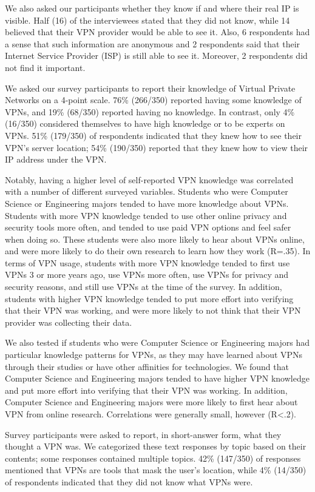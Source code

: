 We also asked our participants whether they know if and where their real IP is visible. Half (16) of the interviewees stated that they did not know, while 14 believed that their VPN provider would be able to see it. Also, 6 respondents had a sense that such information are anonymous and 2 respondents said that their Internet Service Provider (ISP) is still able to see it. Moreover, 2 respondents did not find it important.

We asked our survey participants to report their knowledge of Virtual Private Networks on a 4-point scale. 76\% (266/350) reported having some knowledge of VPNs, and 19\% (68/350) reported having no knowledge. In contrast, only 4\% (16/350) considered themselves to have high knowledge or to be experts on VPNs. 51\% (179/350) of respondents indicated that they knew how to see their VPN’s server location; 54\% (190/350) reported that they knew how to view their IP address under the VPN.

Notably, having a higher level of self-reported VPN knowledge was correlated with a number of different surveyed variables. Students who were Computer Science or Engineering majors tended to have more knowledge about VPNs. Students with more VPN knowledge tended to use other online privacy and security tools more often, and tended to use paid VPN options and feel safer when doing so. These students were also more likely to hear about VPNs online, and were more likely to do their own research to learn how they work (R=.35). In terms of VPN usage, students with more VPN knowledge tended to first use VPNs 3 or more years ago, use VPNs more often, use VPNs for privacy and security reasons, and still use VPNs at the time of the survey. In addition, students with higher VPN knowledge tended to put more effort into verifying that their VPN was working, and were more likely to not think that their VPN provider was collecting their data.

We also tested if students who were Computer Science or Engineering majors had particular knowledge patterns for VPNs, as they may have learned about VPNs through their studies or have other affinities for technologies. We found that Computer Science and Engineering majors tended to have higher VPN knowledge and put more effort into verifying that their VPN was working. In addition, Computer Science and Engineering majors were more likely to first hear about VPN from online research. Correlations were generally small, however (R<.2).

Survey participants were asked to report, in short-answer form, what they thought a VPN was. We categorized these text responses by topic based on their contents; some responses contained multiple topics. 42\% (147/350) of responses mentioned that VPNs are tools that mask the user’s location, while 4\% (14/350) of respondents indicated that they did not know what VPNs were.


